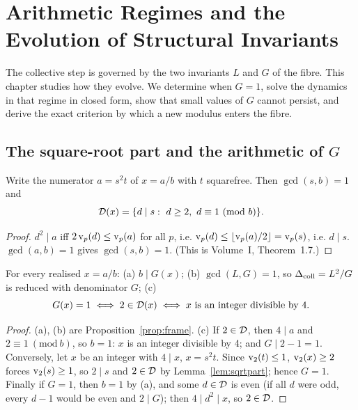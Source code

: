 \chapter{Arithmetic Regimes and the Evolution of Structural Invariants}\label{ch:regimes}

The collective step is governed by the two invariants \(L\) and \(G\) of the fibre. This chapter studies how they evolve. We determine when \(G=1\), solve the dynamics in that regime in closed form, show that small values of \(G\) cannot persist, and derive the exact criterion by which a new modulus enters the fibre.

\section{\texorpdfstring{The square-root part and the arithmetic of \(G\)}{The square-root part and the arithmetic of G}}

\begin{lemma}\label{lem:sqrtpart}
Write the numerator \(a=s^2t\) of \(x=a/b\) with \(t\) squarefree. Then \(\gcd(s,b)=1\) and
\[
\Dx(x)=\{d\mid s:\ d\ge2,\ d\equiv1\ (\mathrm{mod}\ b)\}.
\]
\end{lemma}
\begin{proof}
\(d^2\mid a\) iff \(2\operatorname{v}_p(d)\le\operatorname{v}_p(a)\) for all \(p\), i.e. \(\operatorname{v}_p(d)\le\lfloor\operatorname{v}_p(a)/2\rfloor=\operatorname{v}_p(s)\), i.e. \(d\mid s\). \(\gcd(a,b)=1\) gives \(\gcd(s,b)=1\). (This is Volume~I, Theorem~1.7.)
\end{proof}

\begin{theorem}[Arithmetic of \(G\)]\label{thm:G-arith}
For every realised \(x=a/b\): (a) \(b\mid G(x)\); (b) \(\gcd(L,G)=1\), so \(\Delta_{\mathrm{coll}}=L^2/G\) is reduced with denominator \(G\); (c)
\[
G(x)=1\iff 2\in\mathcal{D}(x)\iff x\text{ is an integer divisible by }4 .
\]
\end{theorem}
\begin{proof}
(a), (b) are Proposition~\ref{prop:frame}. (c) If \(2\in\mathcal{D}\), then \(4\mid a\) and \(2\equiv1\ (\mathrm{mod}\ b)\), so \(b=1\): \(x\) is an integer divisible by 4; and \(G\mid 2-1=1\). Conversely, let \(x\) be an integer with \(4\mid x\), \(x=s^2t\). Since \(\operatorname{v}_2(t)\le1\), \(\operatorname{v}_2(x)\ge2\) forces \(\operatorname{v}_2(s)\ge1\), so \(2\mid s\) and \(2\in\mathcal{D}\) by Lemma~\ref{lem:sqrtpart}; hence \(G=1\). Finally if \(G=1\), then \(b=1\) by (a), and some \(d\in\mathcal{D}\) is even (if all \(d\) were odd, every \(d-1\) would be even and \(2\mid G\)); then \(4\mid d^2\mid x\), so \(2\in\mathcal{D}\).
\end{proof}

